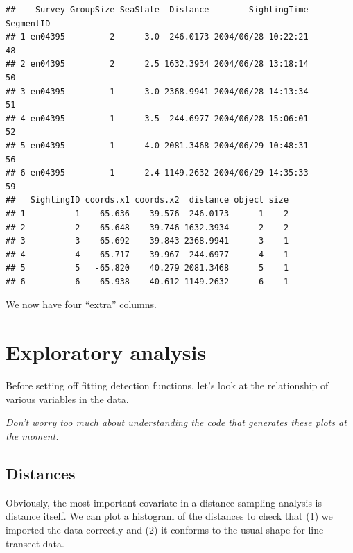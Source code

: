 \documentclass[]{book}
\newenvironment{Shaded}{\begin{snugshade}}{\end{snugshade}}
\newcommand{\KeywordTok}[1]{\textcolor[rgb]{0.13,0.29,0.53}{\textbf{#1}}}
\newcommand{\DataTypeTok}[1]{\textcolor[rgb]{0.13,0.29,0.53}{#1}}
\newcommand{\StringTok}[1]{\textcolor[rgb]{0.31,0.60,0.02}{#1}}
\newcommand{\OperatorTok}[1]{\textcolor[rgb]{0.81,0.36,0.00}{\textbf{#1}}}
\newcommand{\NormalTok}[1]{#1}
\theoremstyle{definition}
\theoremstyle{definition}
\theoremstyle{remark}
\begin{document}
\begin{verbatim}
##    Survey GroupSize SeaState  Distance        SightingTime SegmentID
## 1 en04395         2      3.0  246.0173 2004/06/28 10:22:21        48
## 2 en04395         2      2.5 1632.3934 2004/06/28 13:18:14        50
## 3 en04395         1      3.0 2368.9941 2004/06/28 14:13:34        51
## 4 en04395         1      3.5  244.6977 2004/06/28 15:06:01        52
## 5 en04395         1      4.0 2081.3468 2004/06/29 10:48:31        56
## 6 en04395         1      2.4 1149.2632 2004/06/29 14:35:33        59
##   SightingID coords.x1 coords.x2  distance object size
## 1          1   -65.636    39.576  246.0173      1    2
## 2          2   -65.648    39.746 1632.3934      2    2
## 3          3   -65.692    39.843 2368.9941      3    1
## 4          4   -65.717    39.967  244.6977      4    1
## 5          5   -65.820    40.279 2081.3468      5    1
## 6          6   -65.938    40.612 1149.2632      6    1
\end{verbatim}

We now have four ``extra'' columns.

\section{Exploratory analysis}\label{exploratory-analysis}

Before setting off fitting detection functions, let's look at the
relationship of various variables in the data.

\emph{Don't worry too much about understanding the code that generates
these plots at the moment.}

\subsection{Distances}\label{distances}

Obviously, the most important covariate in a distance sampling analysis
is distance itself. We can plot a histogram of the distances to check
that (1) we imported the data correctly and (2) it conforms to the usual
shape for line transect data.

\begin{Shaded}
\end{Shaded}
\end{document}
